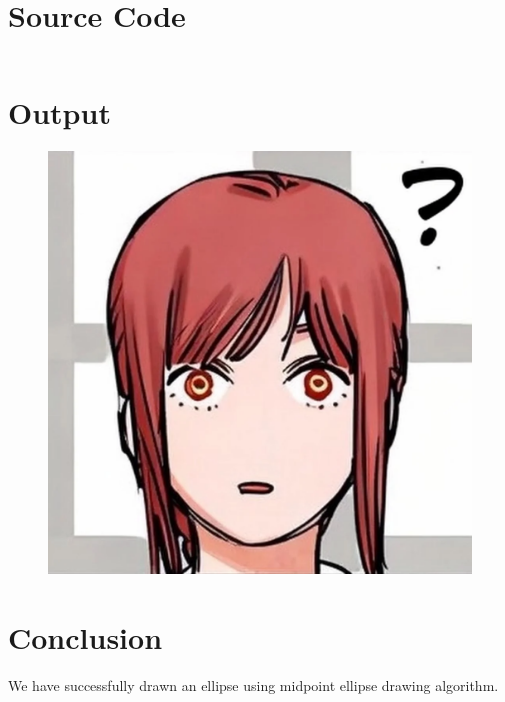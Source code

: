 \documentclass[12pt]{article}
\begin{document}
	\section{Source Code}
	\begin{verbatim}

	\end{verbatim}
	\newpage
	\section{Output}

	\begin{figure}[!h]
		\hspace*{-1cm}
		\centering
		\includegraphics[width=1.01\linewidth]{outputx.png}
		\caption{}
		\label{fig:}
	\end{figure}

	\section{Conclusion}
	We have successfully drawn an ellipse using midpoint ellipse drawing algorithm.
\end{document}
